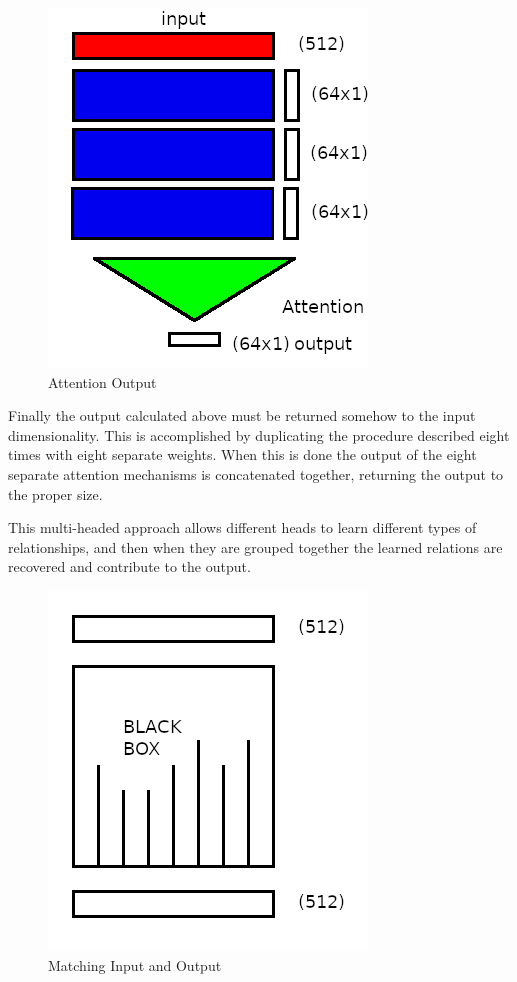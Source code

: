 \begin{figure}[H]
	\begin{center}
		
		
		\includegraphics[scale=0.5]{diagram-mat04-64}
	\end{center}
	\caption[Attention Output]{Attention Output}
	
	\label{attantion-7}
\end{figure}




Finally the output calculated above must be returned somehow to the input dimensionality. This is accomplished by duplicating the procedure described eight times with eight separate weights. When this is done the output of the eight separate attention mechanisms is concatenated together, returning the output to the proper size.

This multi-headed approach allows different heads to learn different types of relationships, and then when they are grouped together the learned relations are recovered and contribute to the output.

\begin{figure}[H]
	\begin{center}
		
	
	\includegraphics[scale=0.5]{diagram-mat02}
\end{center}
	\caption[Matching Input and Output]{Matching Input and Output}
	\label{attention-matching}

\end{figure}


